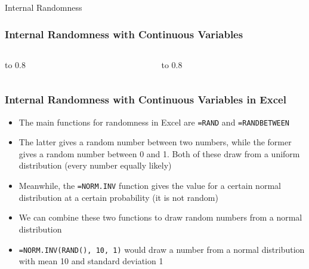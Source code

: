 \documentclass[handout, 11pt]{beamer}
\begin{document}
\begin{section}{Internal Randomness}
\begin{frame}
\begin{itemize}
\end{itemize}
\end{frame}
\begin{frame}
\frametitle{Internal Randomness with Continuous Variables}
\begin{columns}
\begin{column}{0.5\textwidth}
\vbox to 0.8
\end{column}
\begin{column}{0.5\textwidth}
\vbox to 0.8
\end{column}
\end{columns}
\end{frame}
\begin{frame}
\frametitle{Internal Randomness with Continuous Variables in Excel}
\begin{itemize}
\item The main functions for randomness in Excel are
\texttt{=RAND}
and
\texttt{=RANDBETWEEN}
\vfill
\item The latter gives a random number between two numbers, while the former gives a random number between 0 and 1. Both of these draw from a uniform distribution (every number equally likely)
\vfill
\item Meanwhile, the
\texttt{=NORM.INV}
function gives the value for a certain normal distribution at a certain probability (it is not random)
\vfill
\item We can combine these two functions to draw random numbers from a normal distribution
\vfill
\item \texttt{=NORM.INV(RAND(), 10, 1)}
would draw a number from a normal distribution with mean 10 and standard deviation 1
\end{itemize}

\end{frame}
\end{section}
\end{document}

